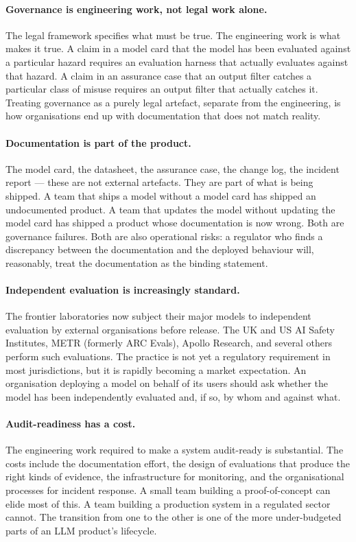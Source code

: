 \paragraph{Governance is engineering work, not legal work
alone.} The legal framework specifies what must be true. The
engineering work is what makes it true. A claim in a model
card that the model has been evaluated against a particular
hazard requires an evaluation harness that actually evaluates
against that hazard. A claim in an assurance case that an
output filter catches a particular class of misuse requires an
output filter that actually catches it. Treating governance as
a purely legal artefact, separate from the engineering, is
how organisations end up with documentation that does not
match reality.

\paragraph{Documentation is part of the product.} The model
card, the datasheet, the assurance case, the change log, the
incident report --- these are not external artefacts. They are
part of what is being shipped. A team that ships a model
without a model card has shipped an undocumented product. A
team that updates the model without updating the model card
has shipped a product whose documentation is now wrong. Both
are governance failures. Both are also operational risks: a
regulator who finds a discrepancy between the documentation
and the deployed behaviour will, reasonably, treat the
documentation as the binding statement.

\paragraph{Independent evaluation is increasingly standard.}
The frontier laboratories now subject their major models to
independent evaluation by external organisations before
release. The UK and US AI Safety Institutes, METR (formerly
ARC Evals), Apollo Research, and several others perform such
evaluations. The practice is not yet a regulatory requirement
in most jurisdictions, but it is rapidly becoming a market
expectation. An organisation deploying a model on behalf of
its users should ask whether the model has been independently
evaluated and, if so, by whom and against what.

\paragraph{Audit-readiness has a cost.} The engineering work
required to make a system audit-ready is substantial. The
costs include the documentation effort, the design of
evaluations that produce the right kinds of evidence, the
infrastructure for monitoring, and the organisational
processes for incident response. A small team building a
proof-of-concept can elide most of this. A team building a
production system in a regulated sector cannot. The transition
from one to the other is one of the more under-budgeted parts
of an LLM product's lifecycle.

